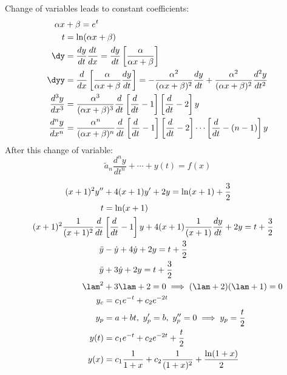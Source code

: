 \documentclass[Maths.tex]{subfiles}
\begin{document}
Change of variables leads to constant coefficients:
\begin{align}
    \alpha x &+ \beta = e^t \\
    t &= \ln(\alpha x + \beta) \\
    \dy &= \frac{dy}{dt}\frac{dt}{dx} = \frac{dy}{dt}\left[\frac{\alpha}{\alpha x + \beta}\right] \\
    \dyy &= \frac{d}{dx}\left[\frac{\alpha}{\alpha x + \beta} \frac{dy}{dt}\right] = -\frac{\alpha^2}{(\alpha x + \beta)^2}\frac{dy}{dt} + \frac{\alpha^2}{(\alpha x + \beta)^2}\frac{d^2 y}{dt^2} \\
    \frac{d^3y}{dx^3} &= \frac{\alpha^3}{(\alpha x + \beta)^3}\frac{d}{dt}\left[\frac{d}{dt} - 1\right]\left[\frac{d}{dt} - 2\right]y \\
    \frac{d^ny}{dx^n} &= \frac{\alpha^n}{(\alpha x + \beta)^n}\frac{d}{dt}\left[\frac{d}{dt} - 1\right]\left[\frac{d}{dt} - 2\right]\cdots\left[\frac{d}{dt} - (n - 1)\right]y
\end{align}
After this change of variable:
\begin{equation}
    \tilde{a}_n \frac{d^ny}{dt^n} + \cdots + y(t) = f(x)
\end{equation}

\begin{example}
\begin{align}
    (x + 1)^2y'' &+ 4(x+1)y' + 2y = \ln(x+1) + \frac{3}{2} \\
    t &= \ln(x+1) \\
    (x+1)^2\frac{1}{(x+1)^2}\frac{d}{dt}&\left[\frac{d}{dt}-1\right]y + 4(x+1)\frac{1}{(x+1)}\frac{dy}{dt} + 2y = t + \frac{3}{2} \\
    \ddot{y} &- \dot{y} + 4\dot{y} + 2y = t + \frac{3}{2} \\
    \ddot{y} &+ 3\dot{y} + 2y = t + \frac{3}{2} \\
    \lam^2 &+ 3\lam + 2 = 0 \implies (\lam + 2)(\lam + 1) = 0 \\
    y_c &= c_1e^{-t} + c_2e^{-2t} \\
    y_p &= a + bt,~ y'_p = b, ~ y''_p = 0 \implies y_p = \frac{t}{2} \\
    y(t) &= c_1e^{-t} + c_2e^{-2t} + \frac{t}{2} \\
    y(x) &= c_1\frac{1}{1+x} + c_2\frac{1}{(1+x)^2} + \frac{\ln(1+x)}{2}
\end{align}
\end{example}
\end{document}

